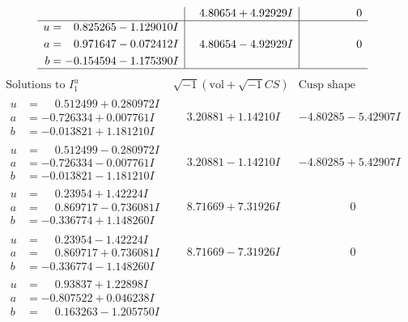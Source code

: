 \documentclass[1p]{elsarticle_modified}
\theoremstyle{definition}
\newcommand{\I}{\sqrt{-1}}
\begin{document}
$$\begin{array}{c|c|c}
 & \phantom{-}4.80654 + 4.92929 I & \phantom{-0.000000 } 0 \\ \hline\begin{aligned}
u &= \phantom{-}0.825265 - 1.129010 I \\
a &= \phantom{-}0.971647 - 0.072412 I \\
b &= -0.154594 - 1.175390 I\end{aligned}
 & \phantom{-}4.80654 - 4.92929 I & \phantom{-0.000000 } 0\\
 \hline 
 \end{array}$$\newpage$$\begin{array}{c|c|c}  
\text{Solutions to }I^u_{1}& \I (\text{vol} + \sqrt{-1}CS) & \text{Cusp shape}\\
 \hline 
\begin{aligned}
u &= \phantom{-}0.512499 + 0.280972 I \\
a &= -0.726334 + 0.007761 I \\
b &= -0.013821 + 1.181210 I\end{aligned}
 & \phantom{-}3.20881 + 1.14210 I & -4.80285 - 5.42907 I \\ \hline\begin{aligned}
u &= \phantom{-}0.512499 - 0.280972 I \\
a &= -0.726334 - 0.007761 I \\
b &= -0.013821 - 1.181210 I\end{aligned}
 & \phantom{-}3.20881 - 1.14210 I & -4.80285 + 5.42907 I \\ \hline\begin{aligned}
u &= \phantom{-}0.23954 + 1.42224 I \\
a &= \phantom{-}0.869717 - 0.736081 I \\
b &= -0.336774 + 1.148260 I\end{aligned}
 & \phantom{-}8.71669 + 7.31926 I & \phantom{-0.000000 } 0 \\ \hline\begin{aligned}
u &= \phantom{-}0.23954 - 1.42224 I \\
a &= \phantom{-}0.869717 + 0.736081 I \\
b &= -0.336774 - 1.148260 I\end{aligned}
 & \phantom{-}8.71669 - 7.31926 I & \phantom{-0.000000 } 0 \\ \hline\begin{aligned}
u &= \phantom{-}0.93837 + 1.22898 I \\
a &= -0.807522 + 0.046238 I \\
b &= \phantom{-}0.163263 - 1.205750 I\end{aligned}

\end{array}$$
\end{document}
